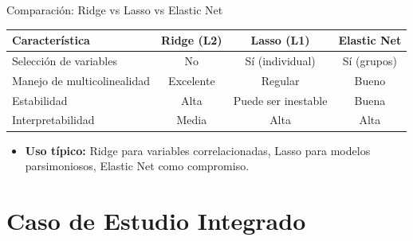 \documentclass[aspectratio=169, 10pt, xcolor=table]{beamer}
\begin{document}
\begin{frame}{Comparación: Ridge vs Lasso vs Elastic Net}
    \begin{table}
        \centering
        \renewcommand{\arraystretch}{1.3}
        \begin{tabular}{l c c c}
            \toprule
            \textbf{Característica} & \textbf{Ridge (L2)} & \textbf{Lasso (L1)} & \textbf{Elastic Net} \\
            \midrule
            Selección de variables & No & Sí (individual) & Sí (grupos) \\
            Manejo de multicolinealidad & Excelente & Regular & Bueno \\
            Estabilidad & Alta & Puede ser inestable & Buena \\
            Interpretabilidad & Media & Alta & Alta \\
            \bottomrule
        \end{tabular}
    \end{table}
    \begin{itemize}
        \item \textbf{Uso típico:} Ridge para variables correlacionadas, Lasso para modelos parsimoniosos, Elastic Net como compromiso.
    \end{itemize}
\end{frame}

\section{Caso de Estudio Integrado}
\end{document}
